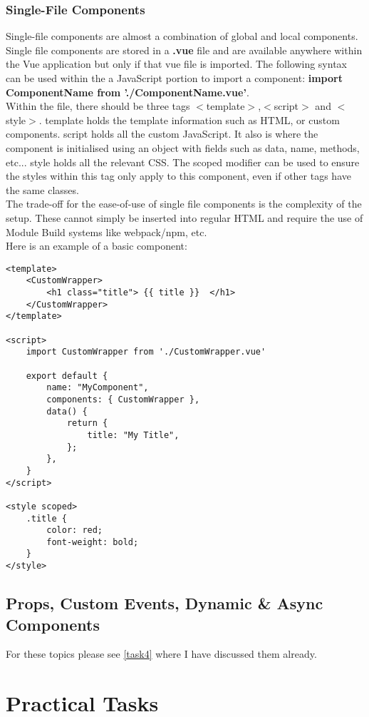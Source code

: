 \documentclass[portfolio.tex]{subfiles}
\begin{document}
		\subsubsection{Single-File Components}
			Single-file components are almost a combination of global and local components. Single file components are stored in a \textbf{.vue} file and are  available anywhere within the Vue application but only if that vue file is imported. The following syntax can be used within the a JavaScript portion to import a component: \textbf{import ComponentName from './ComponentName.vue'}.\\

			Within the file, there should be three tags $<$template$>$,$<$script$>$ and $<$style$>$. template holds the template information such as HTML, or custom components. script holds all the custom JavaScript. It also is where the component is initialised using an object with fields such as data, name, methods, etc... style holds all the relevant CSS. The scoped modifier can be used to ensure the styles within this tag only apply to this component, even if other tags have the same classes.\\

			The trade-off for the ease-of-use of single file components is the complexity of the setup. These cannot simply be inserted into regular HTML and require the use of Module Build systems like webpack/npm, etc.\\

			Here is an example of a basic component:

			\begin{lstlisting}
<template>
	<CustomWrapper>
		<h1 class="title"> {{ title }}  </h1>
	</CustomWrapper>
</template>

<script>
	import CustomWrapper from './CustomWrapper.vue'

	export default {
		name: "MyComponent",
		components: { CustomWrapper },
		data() {
			return {
				title: "My Title",
			};
		},
	}
</script>

<style scoped>
	.title {
		color: red;
		font-weight: bold;
	}
</style>
			\end{lstlisting}
	\subsection{Props, Custom Events, Dynamic \& Async Components}
		For these topics please see \ref{task4} where I have discussed them already.

	\section{Practical Tasks}
\end{document}
